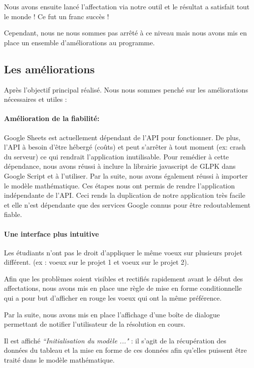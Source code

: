 \documentclass[final,poster]{polytech/polytech}
\begin{document}
Nous avons ensuite lancé l'affectation via notre outil et le résultat a satisfait tout le monde ! Ce fut un franc succès ! 

Cependant, nous ne nous sommes pas arrêté à ce niveau mais nous avons mis en place un ensemble d'améliorations au programme.

\subsection{Les améliorations}

Après l'objectif principal réalisé. Nous nous sommes penché sur les améliorations nécessaires et utiles :

\paragraph{Amélioration de la fiabilité:}
Google Sheets est actuellement dépendant de l’API pour fonctionner. De plus, l’API à besoin d'être hébergé (coûts) et peut s'arrêter à tout moment (ex: crash du serveur) ce qui rendrait l'application inutilisable. Pour remédier à cette dépendance, nous avons réussi à inclure la librairie javascript de GLPK dans Google Script et à l'utiliser. Par la suite, nous avons également réussi à importer le modèle mathématique.
Ces étapes nous ont permis de rendre l'application indépendante de l’API. Ceci rends la duplication de notre application très facile et elle n'est dépendante que des services Google connus pour être redoutablement fiable.

\paragraph{Une interface plus intuitive}
Les étudiants n'ont pas le droit d'appliquer le même voeux sur plusieurs projet différent. (ex : voeux  sur le projet 1 et voeux  sur le projet 2).

Afin que les problèmes soient visibles et rectifiés rapidement avant le début des affectations, nous avons mis en place une règle de mise en forme conditionnelle qui a pour but d'afficher en rouge les voeux qui ont la même préférence.

Par la suite, nous avons mis en place l'affichage d'une boîte de dialogue permettant de notifier l'utilisateur de la résolution en cours.

 Il est affiché\textit{ “Initialisation du modèle ..."} : il s'agit de la récupération des données du tableau et la mise en forme de ces données afin qu'elles puissent être traité dans le modèle mathématique.
 
\end{document}
